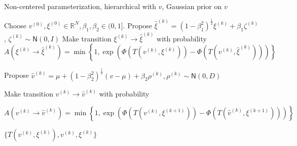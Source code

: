 \documentclass{siamart1116}
\begin{document}
    \begin{algorithm}
    \caption{Non-centered parameterization, hierarchical with $v$, Gaussian prior on $v$}
    \label{alg:hier_v_gaussian}
    \begin{algorithmic}
    \State Choose $v^{(0)}, \xi^{(0)} \in \mathbb{R}^N, \beta_1, \beta_2 \in (0, 1]$.
    \State Propose $\hat\xi^{(k)} = (1-\beta_1^2)^{\frac{1}{2}}\xi^{(k)} + \beta_1 \zeta^{(k)}$, $\zeta^{(k)} \sim \mathsf{N}(0, I)$
    \State Make transition $\xi^{(k)} \to \hat\xi^{(k)}$ with probability
    \[ A(\xi^{(k)} \to \hat\xi^{(k)}) = \min\left\{1, \exp\left(\Phi(T(v^{(k)}, \xi^{(k)})) - \Phi(T(v^{(k)}, \hat \xi^{(k)}))\right) \right\}\]

    \State Propose $\hat v^{(k)} = \mu + (1-\beta_2^2)^{\frac{1}{2}}(v-\mu) + \beta_2 \rho^{(k)}, \rho^{(k)} \sim \mathsf{N}(0,D)$

    \State Make transition $v^{(k)} \to \hat v^{(k)}$ with probability
    
    \[ A(v^{(k)} \to \hat v^{(k)}) = \min\left\{1, \exp\left(\Phi(T(v^{(k)}, \xi^{(k+1)}))-\Phi(T(\hat v^{(k)}, \xi^{(k+1)})) \right) \right\} \]
     

    \EndFor
    \State \Return $\{ T(v^{(k)},\xi^{(k)}), v^{(k)}, \xi^{(k)} \}$
    \end{algorithmic}
    \end{algorithm}



\end{document}
